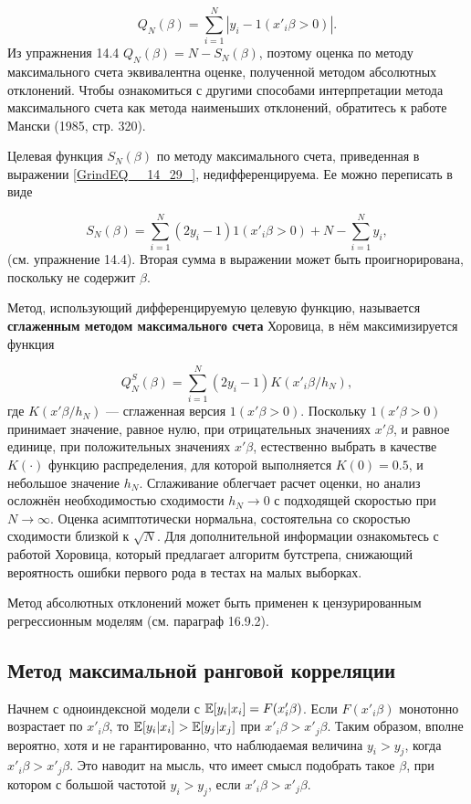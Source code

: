\begin{equation} 
\label{GrindEQ__14_30_} 
Q_N(\beta) = \sum^N_{i=1} |y_i-1(x'_i\beta > 0)|. 
\end{equation} 
Из упражнения 14.4 $Q_N(\beta) = N - S_N(\beta)$, поэтому оценка по методу максимального счета эквивалентна оценке,  полученной методом абсолютных отклонений. Чтобы ознакомиться с другими способами интерпретации метода максимального счета как метода наименьших отклонений, обратитесь к работе Мански (1985,  стр. 320).

Целевая функция $S_N(\beta)$ по методу максимального счета, приведенная в выражении \eqref{GrindEQ__14_29_},  недифференцируема. Ее можно переписать в виде

\[
S_N(\beta) = \sum^N_{i=1} (2y_i-1) 1(x'_i\beta > 0) + N - \sum^N_{i=1} y_i,
\] 
(см. упражнение 14.4). Вторая сумма в выражении может быть проигнорирована, поскольку не содержит $\beta$.

Метод, использующий дифференцируемую целевую функцию, называется \textbf{сглаженным методом максимального счета} Хоровица, в нём максимизируется  функция

\[
Q^S_N(\beta) = \sum^N_{i=1} (2y_i-1) K (x'_i\beta/h_N),
\] 
где $K(x'\beta/h_N)$ --- сглаженная версия $1(x'\beta > 0).$ Поскольку $1(x'\beta > 0)$ принимает значение,  равное нулю,  при отрицательных значениях $x'\beta $,  и равное единице,  при положительных значениях $x'\beta $, естественно выбрать в качестве $K(\cdot)$ функцию распределения,  для которой выполняется $K(0)=0.5$,  и небольшое значение $h_N$. Сглаживание облегчает  расчет оценки,  но анализ осложнён необходимостью сходимости $h_N \to 0$ с подходящей скоростью при  $N \to \infty $. Оценка асимптотически нормальна, состоятельна со скоростью сходимости близкой к $\sqrt{N}$. Для дополнительной информации ознакомьтесь с работой Хоровица,  который предлагает алгоритм бутстрепа,  снижающий вероятность ошибки первого рода в тестах на малых выборках.

Метод абсолютных отклонений может быть применен к цензурированным регрессионным моделям (см. параграф 16.9.2). 

\subsection{Метод максимальной ранговой корреляции}

Начнем с одноиндексной модели с $\mathbb{E}[y_i| x_i] = F(x'_i\beta)$. Если $F(x'_i\beta)$ монотонно возрастает по $x'_i\beta$,  то $\mathbb{E}[y_i| x_i] > \mathbb{E}[y_j| x_j]$ при $x'_i\beta > x'_j\beta $. 
Таким образом,  вполне вероятно,  хотя и не гарантированно,  что наблюдаемая величина $y_i>y_j$,  когда $x'_i\beta > x'_j\beta $. Это наводит на мысль, что имеет смысл подобрать такое $\beta$,  при котором с большой частотой $y_i > y_j$, если $x'_i\beta > x'_j\beta $.

